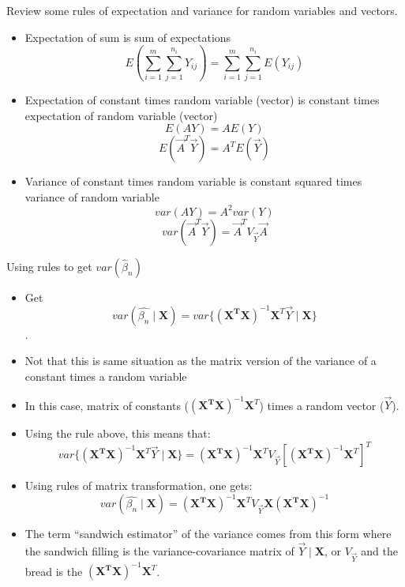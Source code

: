 \documentclass[ignorenonframetext,]{beamer}
\providecommand{\tightlist}{%
  \setlength{\itemsep}{0pt}\setlength{\parskip}{0pt}}
\begin{document}
\begin{frame}{Review some rules of expectation and variance for random
variables and vectors.}

\begin{itemize}
\tightlist
\item
  Expectation of sum is sum of expectations
  \[E(\sum_{i=1}^m \sum_{j=1}^{n_i} Y_{ij}) = \sum_{i=1}^m \sum_{j=1}^{n_i} E(Y_{ij})\]
\item
  Expectation of constant times random variable (vector) is constant
  times expectation of random variable (vector) \[ E(AY) = AE(Y) \]
  \[ E(\vec{A}^T \vec{Y}) = A^T E(\vec{Y}) \]
\item
  Variance of constant times random variable is constant squared times
  variance of random variable \[ var(AY) = A^2 var(Y)\]
  \[ var(\vec{A}^T \vec{Y}) = \vec{A}^T V_{\vec{Y}} \vec{A}\]
\end{itemize}

\end{frame}

\begin{frame}{Using rules to get \(var(\hat{\beta}_n)\)}

\begin{itemize}
\tightlist
\item
  Get
  \[var(\hat{\beta_n}\mid \boldsymbol{X})=var\{ \boldsymbol{(X^T X ) }^{-1} \boldsymbol{X}^T \vec{Y} \mid \boldsymbol{X} \} \].
\item
  Not that this is same situation as the matrix version of the variance
  of a constant times a random variable
\item
  In this case, matrix of constants
  (\(\boldsymbol{(X^T X ) }^{-1} \boldsymbol{X}^T\)) times a random
  vector (\(\vec{Y}\)).
\item
  Using the rule above, this means that:
  \[var\{ \boldsymbol{(X^T X ) }^{-1} \boldsymbol{X}^T \vec{Y} \mid \boldsymbol{X} \} = \boldsymbol{(X^T X ) }^{-1} \boldsymbol{X}^T V_{\vec{Y}}[\boldsymbol{(X^T X ) }^{-1} \boldsymbol{X}^T]^T\]
\item
  Using rules of matrix transformation, one gets:
  \[ var(\hat{\beta_n}\mid \boldsymbol{X})= \boldsymbol{(X^T X ) }^{-1} \boldsymbol{X}^T V_{\vec{Y}} \boldsymbol{X} \boldsymbol{(X^T X ) }^{-1} \]
\item
  The term ``sandwich estimator'' of the variance comes from this form
  where the sandwich filling is the variance-covariance matrix of
  \(\vec{Y} \mid \boldsymbol{X}\), or \(V_{\vec{Y}}\) and the bread is
  the \(\boldsymbol{(X^T X ) }^{-1} \boldsymbol{X}^T\).
\end{itemize}

\end{frame}
\end{document}
